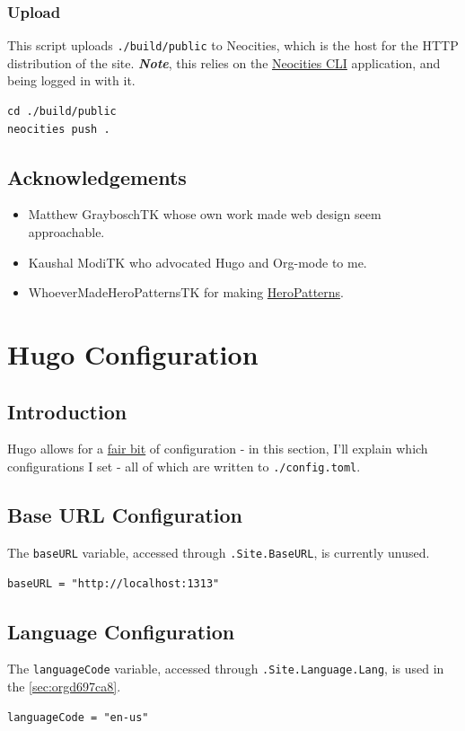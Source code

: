 \documentclass[11pt]{article}
\begin{document}
\subsubsection{Upload}
\label{sec:orgec28220}
This script uploads \texttt{./build/public} to Neocities, which is the host
for the HTTP distribution of the site. \textbf{\emph{Note}}, this relies on the
\href{https://neocities.org/cli}{Neocities CLI} application, and being logged in with it.
\begin{verbatim}
cd ./build/public
neocities push .
\end{verbatim}
\subsection{Acknowledgements}
\label{sec:org214869a}
\begin{itemize}
\item Matthew GrayboschTK whose own work made web design seem
approachable.
\item Kaushal ModiTK who advocated Hugo and Org-mode to me.
\item WhoeverMadeHeroPatternsTK for making \href{https://heropatterns.com}{HeroPatterns}.
\end{itemize}
\section{Hugo Configuration}
\label{sec:orgac33209}
\subsection{Introduction}
\label{sec:org2010857}
Hugo allows for a \href{https://gohugo.io/getting-started/configuration/}{fair bit} of configuration - in this section, I'll
explain which configurations I set - all of which are written to
\texttt{./config.toml}.
\subsection{Base URL Configuration}
\label{sec:org2e7d4a4}
The \texttt{baseURL} variable, accessed through \texttt{.Site.BaseURL}, is currently
unused.
\begin{verbatim}
baseURL = "http://localhost:1313"
\end{verbatim}
\subsection{Language Configuration}
\label{sec:org908bcca}
The \texttt{languageCode} variable, accessed through \texttt{.Site.Language.Lang},
is used in the \ref{sec:orgd697ca8}.
\begin{verbatim}
languageCode = "en-us"
\end{verbatim}
\end{document}
